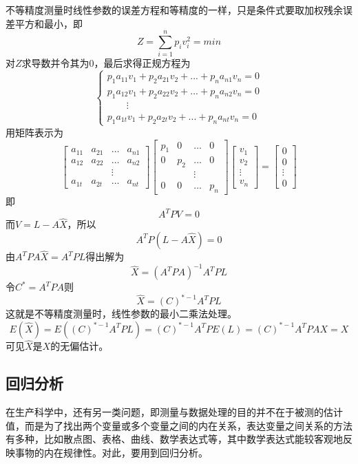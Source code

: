 \begin{enumerate}
	\qquad 不等精度测量时线性参数的误差方程和等精度的一样，只是条件式要取加权残余误差平方和最小，即\[ Z=\sum_{i=1}^{n}p_iv_i^2=min \]
	对$ Z $求导数并令其为0，最后求得正规方程为\[ \begin{cases}
		p_1a_{11}v_1+p_2a_{21}v_2+...+p_na_{n1}v_n=0\\
		p_1a_{12}v_1+p_2a_{22}v_2+...+p_na_{n2}v_n=0\\
		\qquad \vdots\\
		p_1a_{1t}v_1+p_2a_{2t}v_2+...+p_na_{nt}v_n=0
	\end{cases} \]
	用矩阵表示为\[ \begin{bmatrix}
		a_{11}&a_{21}&\dots&a_{n1}\\
		a_{12}&a_{22}&\dots&a_{n2}\\
		& 	 &\vdots\\
		a_{1t}&a_{2t}&\dots&a_{nt}
	\end{bmatrix}\begin{bmatrix}
		p_1	&	0	&	\dots&	0\\
		0	&	p_2	&	\dots&	0\\
		& 	 &\vdots\\
		0	&	0	&	\dots&	p_n
	\end{bmatrix}\begin{bmatrix}
		v_1\\v_2\\\vdots\\v_n
	\end{bmatrix}=\begin{bmatrix}
		0\\0\\\vdots\\0
	\end{bmatrix} \]
	即\[ A^TPV=0 \]
	而$ V=L-A\hat{X} $，所以\[ A^TP(L-A\hat{X})=0 \]
	由$ A^TPA\hat{X}=A^TPL $得出解为\[ \hat{X}=(A^TPA)^{-1}A^TPL \]
	令$ C^*=A^TPA $则\[ \hat{X}=(C)^{*-1}A^TPL \]
	这就是不等精度测量时，线性参数的最小二乘法处理。
	\[ E(\hat{X})=E((C)^{*-1}A^TPL)=(C)^{*-1}A^TPE(L)=(C)^{*-1}A^TPAX=X \]
	可见$ \hat{X} $是$ X $的无偏估计。
\end{enumerate}
\subsection{回归分析}
在生产科学中，还有另一类问题，即测量与数据处理的目的并不在于被测的估计值，而是为了找出两个变量或多个变量之间的内在关系，表达变量之间关系的方法有多种，比如散点图、表格、曲线、数学表达式等，其中数学表达式能较客观地反映事物的内在规律性。对此，要用到回归分析。

